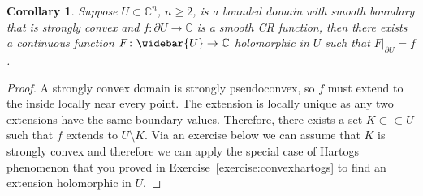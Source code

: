 \documentclass[12pt,openany]{book}
\newcommand{\C}{{\mathbb{C}}}
\theoremstyle{plain}
\newtheorem{cor}[thm]{Corollary}
\theoremstyle{remark}
\theoremstyle{definition}
\theoremstyle{exercise}
\theoremstyle{example}
\newcommand{\exerciseref}[1]{\hyperref[#1]{Exercise~\ref*{#1}}}
\begin{document}
\begin{cor} \label{cor:bochnerhartogsstrconvex}
Suppose $U \subset \C^n$, $n \geq 2$, is a bounded domain with smooth boundary that is
strongly convex
and $f \colon \partial U \to \C$ is a smooth CR function, then
there exists a continuous function $F \colon \widebar{U} \to \C$
holomorphic in $U$
such that $F|_{\partial U} = f$.
\end{cor}

\begin{proof}
A strongly convex domain is strongly pseudoconvex, so $f$ must extend to the
inside locally near every point.  The extension is locally unique as any two
extensions have the same boundary values.  Therefore, there exists a set
$K \subset \subset U$ such that $f$ extends to $U \setminus K$.
Via an exercise below we can assume that $K$ is strongly convex and
therefore we can apply the special case of Hartogs phenomenon
that you proved in \exerciseref{exercise:convexhartogs} to find an
extension holomorphic in $U$.
\end{proof}
\end{document}
